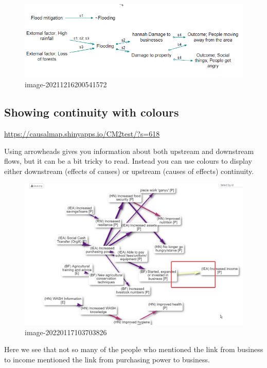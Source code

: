 \documentclass[
]{book}
\begin{document}
\begin{figure}
\centering
\includegraphics[width=6.77083in,height=\textheight]{_assets/image-20211216200541572.png}
\caption{image-20211216200541572}
\end{figure}

\hypertarget{showing-continuity-with-colours}{%
\subsection{Showing continuity with colours}\label{showing-continuity-with-colours}}

\url{https://causalmap.shinyapps.io/CM2test/?s=618}

Using arrowheads gives you information about both upstream and downstream flows, but it can be a bit tricky to read. Instead you can use colours to display either downstream (effects of causes) or upstream (causes of effects) continuity.

\begin{figure}
\centering
\includegraphics[width=6.77083in,height=\textheight]{_assets/image-20220117103703826.png}
\caption{image-20220117103703826}
\end{figure}

Here we see that not so many of the people who mentioned the link from business to income mentioned the link from purchasing power to business.
\end{document}
